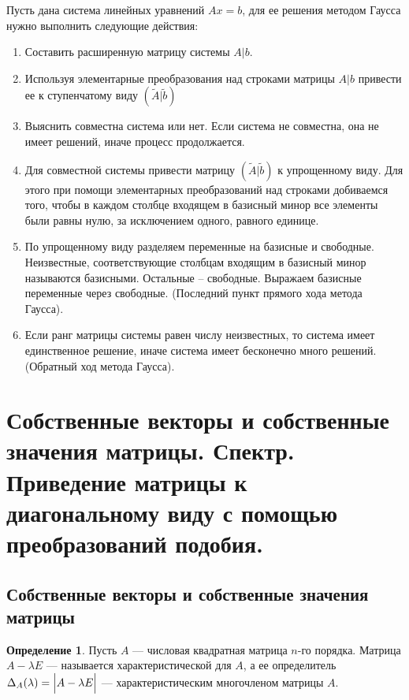 \documentclass[12pt]{report}
\theoremstyle{definition}
\newtheorem{definition}[theorem]{Определение}
\begin{document}
Пусть дана система линейных уравнений $Ax = b$, для ее решения методом Гаусса
нужно выполнить следующие действия:

\begin{enumerate}
\item Составить расширенную матрицу системы $A|b$.
\item Используя элементарные преобразования над строками матрицы $A|b$
  привести ее  к ступенчатому виду $(\tilde{A}|\tilde{b})$
\item Выяснить совместна система или нет.
  Если система не совместна, она не имеет решений, иначе процесс продолжается.
\item Для совместной системы привести матрицу $(\tilde{A}|\tilde{b})$ к
  упрощенному виду. Для этого при помощи элементарных преобразований над строками
  добиваемся того, чтобы в каждом столбце входящем в базисный минор все элементы
  были равны нулю, за исключением одного, равного единице.
\item По упрощенному виду разделяем переменные на базисные и свободные.
  Неизвестные, соответствующие столбцам входящим в базисный минор называются базисными.
  Остальные -- свободные. Выражаем базисные переменные через свободные.
  (Последний пункт прямого хода метода Гаусса).
\item Если ранг матрицы системы равен числу неизвестных, то система имеет единственное
  решение, иначе система имеет бесконечно много решений.
  (Обратный ход метода Гаусса).
\end{enumerate}


\section
{
  Собственные векторы и собственные значения матрицы.
  Спектр. Приведение матрицы к диагональному виду с помощью
  преобразований подобия.
}

\subsection{Собственные векторы и собственные значения матрицы}
\begin{definition}
Пусть $A$ --- числовая квадратная матрица $n$-го порядка.
Матрица $A - \lambda E$ --- называется характеристической для $A$,
а ее определитель $\Delta_A(\lambda) = \Bigl| A - \lambda E \Bigl|$ ---
характеристическим многочленом матрицы $A$.
\end{definition}
\end{document}
